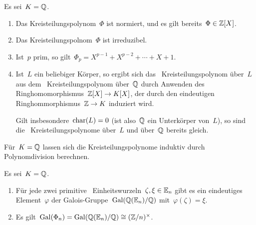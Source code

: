 \begin{proposition}
  Es sei~$K = \mathbb{Q}$.
  \begin{enumerate}
    \item
      Das Kreisteilungspolynom~$\Phi$ ist normiert, und es gilt bereits~$\Phi \in \mathbb{Z}[X]$.
    \item
      Das Kreisteilungspolnom~$\Phi$ ist irreduzibel.
    \item
      Ist~$p$ prim, so gilt~$\Phi_p = X^{p-1} + X^{p-2} + \dotsb + X + 1$.
    \item
      Ist~$L$ ein beliebiger Körper, so ergibt sich das~ Kreisteilungspolynom über~$L$ aus dem~ Kreisteilungspolynom über~$\mathbb{Q}$ durch Anwenden des Ringhomomorphismus~$\Integer[X] \to K[X]$, der durch den eindeutigen Ringhommorphismus~$\Integer \to K$ induziert wird.

      Gilt insbesondere~$\operatorname{char}(L) = 0$ (ist also~$\mathbb{Q}$ ein Unterkörper von~$L$), so sind die~ Kreisteilungspolynome über~$L$ und über~$\mathbb{Q}$ bereits gleich.
  \end{enumerate}
\end{proposition}

\begin{remark}
  Für~$K = \mathbb{Q}$ lassen sich die Kreisteilungspolynome induktiv durch Polynomdivision berechnen.
\end{remark}

\begin{corollary}
  Es sei~$K = \mathbb{Q}$.
  \begin{enumerate}
    \item
      Für jede zwei primitive~ Einheitswurzeln~$\zeta, \xi \in \operatorname{\mathbb{E}}_n$ gibt es ein eindeutiges Element~$\varphi$ der Galois-Gruppe~$\operatorname{Gal}( \mathbb{Q}(\operatorname{\mathbb{E}}_n) / \mathbb{Q} )$ mit~$\varphi(\zeta) = \xi$.
    \item
      Es gilt~$\operatorname{Gal}( \Phi_n ) = \operatorname{Gal}( \mathbb{Q}(\operatorname{\mathbb{E}}_n) / \mathbb{Q} ) \cong (\mathbb{Z}/n)^\times$.
  \end{enumerate}
\end{corollary}




